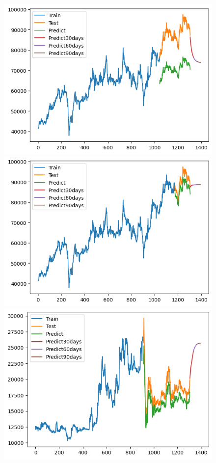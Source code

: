\begin{figure}[H]
\begin{minipage}{0.15\textwidth}
    \includegraphics[width=1\textwidth]{resources/chapter-5/newdata1/result/VCB_ RNN_8-2.png}
    \end{minipage}
    \hfill
        \begin{minipage}{0.15\textwidth}
    \centering
    \includegraphics[width=1\textwidth]{resources/chapter-5/newdata1/result/VCB_ RNN_9-1.png}
    \end{minipage}
    \hfill
    \begin{minipage}{0.15\textwidth}
    \centering
    \includegraphics[width=1\textwidth]{resources/chapter-5/newdata1/result/EIB_ RNN_7-3.png}

\end{minipage}
\end{figure}
